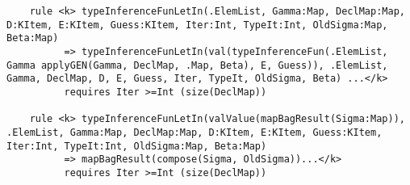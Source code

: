\begin{lstlisting}
    rule <k> typeInferenceFunLetIn(.ElemList, Gamma:Map, DeclMap:Map, D:KItem, E:KItem, Guess:KItem, Iter:Int, TypeIt:Int, OldSigma:Map, Beta:Map)
          => typeInferenceFunLetIn(val(typeInferenceFun(.ElemList, Gamma applyGEN(Gamma, DeclMap, .Map, Beta), E, Guess)), .ElemList, Gamma, DeclMap, D, E, Guess, Iter, TypeIt, OldSigma, Beta) ...</k>
          requires Iter >=Int (size(DeclMap))

    rule <k> typeInferenceFunLetIn(valValue(mapBagResult(Sigma:Map)), .ElemList, Gamma:Map, DeclMap:Map, D:KItem, E:KItem, Guess:KItem, Iter:Int, TypeIt:Int, OldSigma:Map, Beta:Map)
          => mapBagResult(compose(Sigma, OldSigma))...</k>
          requires Iter >=Int (size(DeclMap))
          
          
\end{lstlisting}

